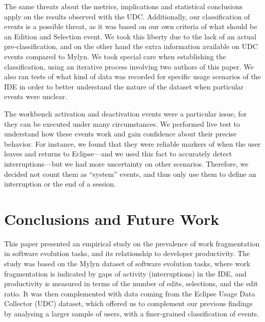 \documentclass[times]{smrauth}
\begin{document}

The same threats about the metrics, implications and statistical conclusions apply on the results observed with the UDC.  Additionally, our classification of events is a possible threat, as it was based on our own criteria of what should be an Edition and Selection event. We took this liberty due to the lack of an actual pre-classification, and on the other hand the extra information available on UDC events compared to Mylyn. We took special care when establishing the classification, using an iterative process involving two authors of this paper. We also ran tests of what kind of data was recorded for specific usage scenarios of the IDE in order to better understand the nature of the dataset when particular events were unclear.  %

The workbench activation and deactivation events were a particular issue, for they can be executed under many circumstances. We performed live test to understand how these events work and gain confidence about their precise behavior. For instance, we found that they were reliable markers of when the user leaves and returns to Eclipse---and we used this fact to accurately detect interruptions---but we had more uncertainty on other scenarios. Therefore, we decided not count them as ``system'' events, and thus only use them to define an interruption or the end of a session.



\section{Conclusions and Future Work}
This paper presented an empirical study on the prevalence of work fragmentation in software evolution tasks, and its relationship to developer productivity. The study was based on the Mylyn dataset of software evolution tasks, where work fragmentation is indicated by gaps of activity (interruptions) in the IDE, and productivity is measured in terms of the number of edits, selections, and the edit ratio. It was then complemented with data coming from the Eclipse Usage Data Collector (UDC) dataset, which offered us to complement our previous findings by analysing a larger sample of users, with a finer-grained classification of events.
\end{document}
